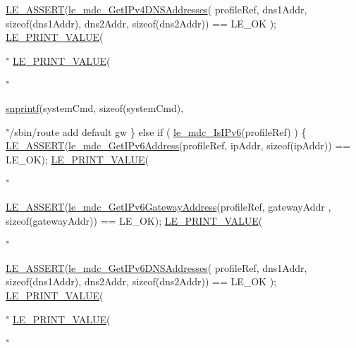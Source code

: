 \begin{DoxyCodeInclude}
{{        \hyperlink{le__log_8h_ac0dbbef91dc0fed449d0092ff0557b39}{LE\_ASSERT}(\hyperlink{le__mdc__interface_8h_a0dd0dcf60d647388fa3e1973917a6161}{le\_mdc\_GetIPv4DNSAddresses}( profileRef,
                                              dns1Addr, \textcolor{keyword}{sizeof}(dns1Addr),
                                              dns2Addr, \textcolor{keyword}{sizeof}(dns2Addr)) == LE\_OK );
        \hyperlink{le__print_8h_a1a6709c55d8d08c496846ba2295138b7}{LE\_PRINT\_VALUE}(\textcolor{stringliteral}{"%
        \hyperlink{le__print_8h_a1a6709c55d8d08c496846ba2295138b7}{LE\_PRINT\_VALUE}(\textcolor{stringliteral}{"%

        \hyperlink{app_stop_client_8c_a2b6c4b2a795957a91039524b524be480}{snprintf}(systemCmd, \textcolor{keyword}{sizeof}(systemCmd), \textcolor{stringliteral}{"/sbin/route add default gw %
    \}
    \textcolor{keywordflow}{else} \textcolor{keywordflow}{if} ( \hyperlink{le__mdc__interface_8h_adde11de0b17b2c937acca6355b6fba11}{le\_mdc\_IsIPv6}(profileRef) )
    \{
        \hyperlink{le__log_8h_ac0dbbef91dc0fed449d0092ff0557b39}{LE\_ASSERT}(\hyperlink{le__mdc__interface_8h_a73ef38d4d2399580d552b12c62f1c508}{le\_mdc\_GetIPv6Address}(profileRef, ipAddr, \textcolor{keyword}{sizeof}(ipAddr)) 
      == LE\_OK);
        \hyperlink{le__print_8h_a1a6709c55d8d08c496846ba2295138b7}{LE\_PRINT\_VALUE}(\textcolor{stringliteral}{"%

        \hyperlink{le__log_8h_ac0dbbef91dc0fed449d0092ff0557b39}{LE\_ASSERT}(\hyperlink{le__mdc__interface_8h_a3bb60671304e2b4d3b23d8e623f9940c}{le\_mdc\_GetIPv6GatewayAddress}(profileRef, gatewayAddr
      , \textcolor{keyword}{sizeof}(gatewayAddr))
                                                                                          == LE\_OK);
        \hyperlink{le__print_8h_a1a6709c55d8d08c496846ba2295138b7}{LE\_PRINT\_VALUE}(\textcolor{stringliteral}{"%

        \hyperlink{le__log_8h_ac0dbbef91dc0fed449d0092ff0557b39}{LE\_ASSERT}(\hyperlink{le__mdc__interface_8h_ad9cb7d3299620d9dcde551cec45389a1}{le\_mdc\_GetIPv6DNSAddresses}( profileRef,
                                              dns1Addr, \textcolor{keyword}{sizeof}(dns1Addr),
                                              dns2Addr, \textcolor{keyword}{sizeof}(dns2Addr)) == LE\_OK );
        \hyperlink{le__print_8h_a1a6709c55d8d08c496846ba2295138b7}{LE\_PRINT\_VALUE}(\textcolor{stringliteral}{"%
        \hyperlink{le__print_8h_a1a6709c55d8d08c496846ba2295138b7}{LE\_PRINT\_VALUE}(\textcolor{stringliteral}{"%

}}}}}}}}}
\end{DoxyCodeInclude}
